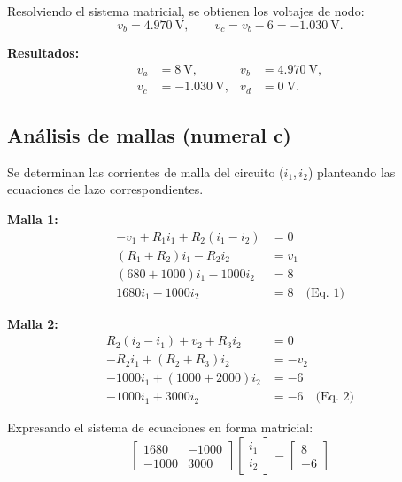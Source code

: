 \documentclass[conference,10pt]{IEEEtran}
\begin{document}
Resolviendo el sistema matricial, se obtienen los voltajes de nodo:
\begin{equation}
  v_b = 4.970~\mathrm{V}, \qquad v_c = v_b - 6 = -1.030~\mathrm{V}.
\end{equation}

\noindent\textbf{Resultados:}
\begin{align*}
  v_a &= 8~\mathrm{V}, & v_b &= 4.970~\mathrm{V},\\
  v_c &= -1.030~\mathrm{V}, & v_d &= 0~\mathrm{V}.
\end{align*}

\subsection{Análisis de mallas (numeral c)}
Se determinan las corrientes de malla del circuito ($i_1, i_2$) planteando las ecuaciones de lazo correspondientes.

\textbf{Malla 1:}
\begin{align*}
    -v_1 + R_1 i_1 + R_2 (i_1 - i_2) &= 0 \\
    (R_1 + R_2) i_1 - R_2 i_2 &= v_1 \\
    (680 + 1000) i_1 - 1000 i_2 &= 8 \\
    1680 i_1 - 1000 i_2 &= 8 \quad \text{(Eq. 1)}
\end{align*}

\textbf{Malla 2:}
\begin{align*}
    R_2 (i_2 - i_1) + v_2 + R_3 i_2 &= 0 \\
    -R_2 i_1 + (R_2 + R_3) i_2 &= -v_2 \\
    -1000 i_1 + (1000 + 2000) i_2 &= -6 \\
    -1000 i_1 + 3000 i_2 &= -6 \quad \text{(Eq. 2)}
\end{align*}

Expresando el sistema de ecuaciones en forma matricial:
\begin{equation*}
    \begin{bmatrix}
        1680 & -1000 \\
        -1000 & 3000
    \end{bmatrix}
    \begin{bmatrix}
        i_1 \\
        i_2
    \end{bmatrix}
    =
    \begin{bmatrix}
        8 \\
        -6
    \end{bmatrix}
\end{equation*}
\end{document}
